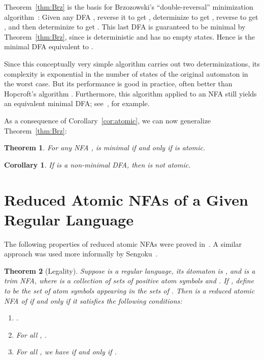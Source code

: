 \documentclass[preprint,12pt]{elsarticle}
\newcommand{\be}{\begin{enumerate}}
\newcommand{\ee}{\end{enumerate}}
\newtheorem{theorem}{Theorem}
\newtheorem{corollary}{Corollary}
\begin{document}
Theorem~\ref{thm:Brz} is the basis for Brzozowski's ``double-reversal'' 
minimization algorithm~\cite{Brz63}:
Given any DFA , reverse it to get , determinize 
 to get , reverse  to get 
, and then determinize  to get 
. This last DFA is guaranteed to be minimal 
by Theorem~\ref{thm:Brz}, since  is deterministic and
 has no empty states.
Hence  is the minimal DFA equivalent to .


Since this conceptually very simple algorithm carries out two 
determinizations, its complexity is exponential in the number of states 
of the original automaton in the worst case. But its 
performance is good in practice, often better than Hopcroft's 
algorithm \cite{TaV05,Wat95}.
Furthermore, this algorithm applied to an NFA still yields an equivalent 
minimal DFA; see~\cite{Wat95}, for example.



As a consequence  of Corollary~\ref{cor:atomic}, we can now generalize 
Theorem~\ref{thm:Brz}:

\begin{theorem}
\label{thm:extension}
For any NFA ,   is minimal if and only if  is atomic. 
\end{theorem}

\begin{corollary}
If  is a non-minimal  DFA, then  is not atomic. 
\end{corollary}



\section{Reduced Atomic NFAs of a Given Regular Language}
\label{sec:reduced}

The following properties of reduced atomic NFAs were proved in~\cite{BrTa13}. 
A similar approach was used more informally by Sengoku~\cite{Sen92}.

\begin{theorem}[Legality]
\label{thm:unions}
Suppose  is a regular language,  its \'atomaton is
, and
 is a trim NFA, where 
 is a collection of 
sets of positive atom symbols and .
If , define 
 to be the set of atom symbols 
appearing in the sets   of . 
Then  is a reduced atomic NFA of  if and only if it satisfies the following
conditions:
\be
\item
\label{cond:in}
.
\item
\label{cond:trans}
For all , .
\item
\label{cond:out}
For all , we have  
if and only if .
\ee
\end{theorem}
\end{document}
